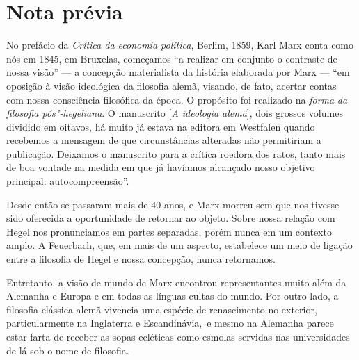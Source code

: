 {\let\clearpage\relax\chapter[Nota prévia]{Nota prévia\protect{}}}


\noindent{}No prefácio da \emph{Crítica da economia política}, Berlim, 1859,
Karl Marx conta como nós em 1845, em Bruxelas, começamos ``a realizar em
conjunto o contraste de nossa visão'' --- a concepção materialista da
história elaborada por Marx --- ``em oposição à visão ideológica da 
filosofia alemã, visando, de fato, acertar contas com nossa consciência
filosófica da época. O propósito foi realizado na \emph{forma} \emph{da
filosofia pós"-hegeliana}. O manuscrito {[}\emph{A ideologia alemã}{]},
dois grossos volumes dividido em oitavos, há muito já estava na editora
em Westfalen quando recebemos a mensagem de que circunstâncias
alteradas não permitiriam a publicação. Deixamos o manuscrito para a
crítica roedora dos ratos, tanto mais de boa vontade na medida em que já
havíamos alcançado nosso objetivo principal: autocompreensão''.

Desde então se passaram mais de 40 anos, e Marx morreu sem que nos
tivesse sido oferecida a oportunidade de retornar ao objeto. Sobre nossa
relação com Hegel nos pronunciamos em partes separadas, porém nunca em
um contexto amplo. A Feuerbach, que, em mais de um aspecto, estabelece
um meio de ligação entre a filosofia de Hegel e nossa concepção, nunca
retornamos.

Entretanto, a visão de mundo de Marx encontrou representantes muito além
da Alemanha e Europa e em todas as línguas cultas do mundo. Por outro
lado, a filosofia clássica alemã vivencia uma espécie de renascimento no
exterior, particularmente na Inglaterra e Escandinávia,\est\ e mesmo na
Alemanha parece estar farta de receber as sopas ecléticas como esmolas
servidas nas universidades de lá sob o nome de filosofia.

